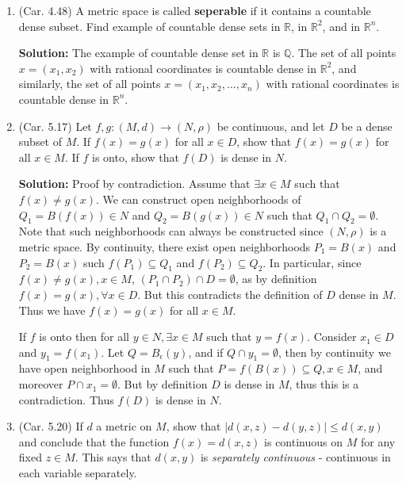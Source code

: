 \documentclass{article}
\def\le{\leqslant}
\def\to{\rightarrow}
\def\QQ{\mathbb Q}
\def\RR{\mathbb R}
\begin{document}
\begin{enumerate}
\item (Car. 4.48) A metric space is called \textbf{seperable} if it contains a countable dense subset. Find example of countable dense sets in $\RR$, in $\RR^2$, and in $\RR^n$.

\textbf{Solution:} The example of countable dense set in $\RR$ is $\QQ$. The set of all points $x=(x_1,x_2)$ with
rational coordinates is countable dense in $\RR^2$, and similarly, the set of all points $x=(x_1,x_2,\ldots,x_n)$ with
rational coordinates is countable dense in $\RR^n$.


\item (Car. 5.17) Let $f,g:(M, d) \to (N, \rho)$ be continuous, and let $D$ be a dense subset of $M$. If $f(x) = g(x)$ for all $x \in D$, show that $f(x) = g(x)$ for all $x \in M$. If $f$ is onto, show that $f(D)$ is dense in $N$.

\textbf{Solution:} Proof by contradiction. Assume that $\exists x \in M$ such that $f(x) \ne g(x)$. We can
construct open neighborhoods of $Q_1=B(f(x))\in N$ and $Q_2=B(g(x))\in N$ such that $Q_1 \cap Q_2 = \emptyset$.
Note that such neighborhoods can always be constructed since $(N,\rho)$ is a metric space.
By continuity, there exist open neighborhoods $P_1=B(x)$ and $P_2=B(x)$ such $f(P_1) \subseteq Q_1$
and  $f(P_2) \subseteq Q_2$. In particular, since $f(x) \ne g(x), x\in M$, $(P_1 \cap P_2) \cap D = \emptyset$, as
by definition $f(x) = g(x), \forall x \in D$. But this contradicts the definition of $D$ dense in $M$. Thus
we have $f(x) = g(x)$ for all $x \in M$.

If $f$ is onto then for all $y\in N, \exists x \in M$ such that $y=f(x)$. 
Consider $x_1 \in D$ and $y_1 = f(x_1)$.
Let  $Q=B_\epsilon(y)$, and if $Q \cap y_1 = \emptyset$, then by continuity we have open neighborhood in $M$ such that
$P=f(B(x)) \subseteq Q, x\in M$, and moreover $P \cap x_1 = \emptyset$. But by definition $D$ is dense in $M$, thus
this is a contradiction. Thus $f(D)$ is dense in $N$.


\item (Car. 5.20) If $d$ a metric on $M$, show that $|d(x, z) - d(y, z)| \le d(x,y)$ and conclude that the function $f(x) = d(x, z)$ is continuous on $M$ for any fixed $z \in M$. This says that $d(x,y)$ is \textit{separately continuous} -  continuous in each variable separately.


\end{enumerate}
\end{document}
